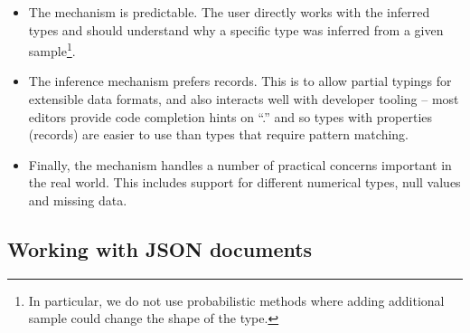 \documentclass[10pt,preprint,blind,clearpagebib]{sigplanconf}
\newcommand{\kvd}[1]{\textnormal{\textcolor{kvdclr}{\sffamily #1}}}
\begin{document}
\begin{itemize}
\item The mechanism is predictable. The user directly works with the inferred types and should 
  understand why a specific type was inferred from a given sample\footnote{In particular, we do 
  not use probabilistic methods where adding additional sample could change the shape of the type.}.

\item The inference mechanism prefers records. This is to allow partial typings for extensible
  data formats, and also interacts well with developer tooling --
  most editors provide code completion hints on ``.'' and so types with properties (records)
  are easier to use than types that require pattern matching.

\item Finally, the mechanism handles a number of practical concerns important in the real world. This includes 
  support for different numerical types, \kvd{null} values and missing data.
\end{itemize}


\subsection{Working with JSON documents}
\label{sec:providers-json}
\end{document}
